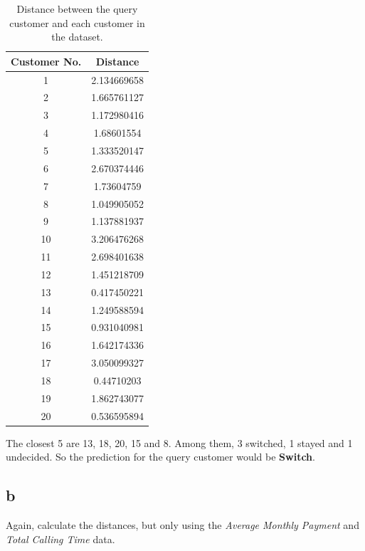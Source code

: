 \documentclass[12pt]{article}
\begin{document}
\begin{table}[!ht]
\footnotesize
\caption{Distance between the query customer and each customer in the dataset.}
\begin{center}
\begin{tabular}{|c|c|}
\hline
Customer No. & Distance\\
\hline
1 & 2.134669658\\
2 & 1.665761127\\
3 & 1.172980416\\
4 & 1.68601554\\
5 & 1.333520147\\
6 & 2.670374446\\
7 & 1.73604759\\
8 & 1.049905052\\
9 & 1.137881937\\
10 & 3.206476268\\
11 & 2.698401638\\
12 & 1.451218709\\
13 & 0.417450221\\
14 & 1.249588594\\
15 & 0.931040981\\
16 & 1.642174336\\
17 & 3.050099327\\
18 & 0.44710203\\
19 & 1.862743077\\
20 & 0.536595894\\
\hline
\end{tabular}
\end{center}
\label{tab:dist1}
\end{table}%

The closest 5 are 13, 18, 20, 15 and 8. Among them, 3 switched, 1 stayed and 1 undecided. So the prediction for the query customer would be \textbf{Switch}.

\subsection{b}
Again, calculate the distances, but only using the \textit{Average Monthly Payment} and \textit{Total Calling Time} data.
\end{document}
